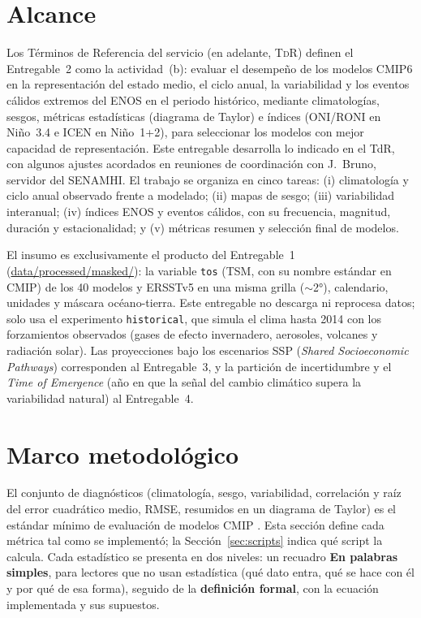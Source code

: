 \documentclass[11pt,a4paper]{article}
\newcommand{\archivo}[1]{\begingroup\hypersetup{urlcolor=black}\url{#1}\endgroup}
\begin{document}
\section{Alcance}
\label{sec:alcance}

Los Términos de Referencia del servicio (en adelante, \textsc{TdR}) definen el Entregable~2 como la actividad~(b): evaluar el desempeño de los modelos CMIP6 en la representación del estado medio, el ciclo anual, la variabilidad y los eventos cálidos extremos del ENOS en el periodo histórico, mediante climatologías, sesgos, métricas estadísticas (diagrama de Taylor) e índices (ONI/RONI en Niño~3.4 e ICEN en Niño~1+2), para seleccionar los modelos con mejor capacidad de representación. Este entregable desarrolla lo indicado en el TdR, con algunos ajustes acordados en reuniones de coordinación con J.~Bruno, servidor del SENAMHI. El trabajo se organiza en cinco tareas: (i) climatología y ciclo anual observado frente a modelado; (ii) mapas de sesgo; (iii) variabilidad interanual; (iv) índices ENOS y eventos cálidos, con su frecuencia, magnitud, duración y estacionalidad; y (v) métricas resumen y selección final de modelos.

El insumo es exclusivamente el producto del Entregable~1 (\archivo{data/processed/masked/}): la variable \texttt{tos} (TSM, con su nombre estándar en CMIP) de los 40 modelos y ERSSTv5 en una misma grilla ($\sim$2°), calendario, unidades y máscara océano-tierra. Este entregable no descarga ni reprocesa datos; solo usa el experimento \texttt{historical}, que simula el clima hasta 2014 con los forzamientos observados (gases de efecto invernadero, aerosoles, volcanes y radiación solar). Las proyecciones bajo los escenarios SSP (\emph{Shared Socioeconomic Pathways}) corresponden al Entregable~3, y la partición de incertidumbre y el \emph{Time of Emergence} (año en que la señal del cambio climático supera la variabilidad natural) al Entregable~4.

\section{Marco metodológico}
\label{sec:metodo}

El conjunto de diagnósticos (climatología, sesgo, variabilidad, correlación y raíz del error cuadrático medio, RMSE, resumidos en un diagrama de Taylor) es el estándar mínimo de evaluación de modelos CMIP \citep{eyring2019,gleckler2008}. Esta sección define cada métrica tal como se implementó; la Sección~\ref{sec:scripts} indica qué script la calcula. Cada estadístico se presenta en dos niveles: un recuadro \textbf{En palabras simples}, para lectores que no usan estadística (qué dato entra, qué se hace con él y por qué de esa forma), seguido de la \textbf{definición formal}, con la ecuación implementada y sus supuestos.
\end{document}
